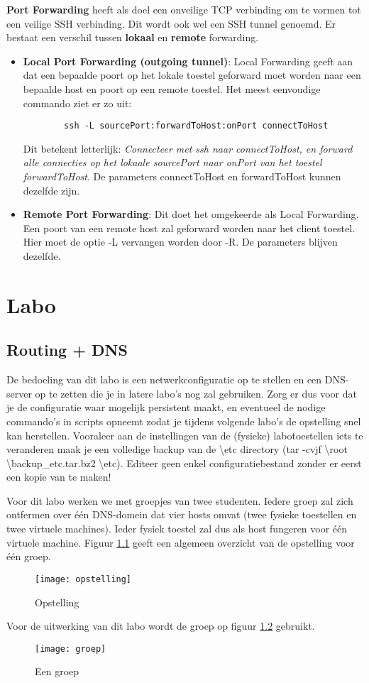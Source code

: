 \documentclass{report}
\begin{document}
	\textbf{Port Forwarding} heeft als doel een onveilige TCP verbinding om te vormen tot een veilige SSH verbinding. Dit wordt ook wel een SSH tunnel genoemd. Er bestaat een verschil tussen \textbf{lokaal} en \textbf{remote} forwarding. 
	\begin{itemize}
		\item \textbf{Local Port Forwarding (outgoing tunnel)}: Local Forwarding geeft aan dat een bepaalde poort op het lokale toestel geforward moet worden naar een bepaalde host en poort op een remote toestel. Het meest eenvoudige commando ziet er zo uit:
		\begin{lstlisting}
		ssh -L sourcePort:forwardToHost:onPort connectToHost
		\end{lstlisting}
		Dit betekent letterlijk: \textit{Connecteer met ssh naar connectToHost, en forward alle connecties op het lokaale sourcePort naar onPort van het toestel forwardToHost}. De parameters connectToHost en forwardToHost kunnen dezelfde zijn.	
		
		\item \textbf{Remote Port Forwarding}: Dit doet het omgekeerde als Local Forwarding. Een poort van een remote host zal geforward worden naar het client toestel. Hier moet de optie -L vervangen worden door -R. De parameters blijven dezelfde.
	\end{itemize}

	\part{Labo}
	\chapter{Routing + DNS}
	De bedoeling van dit labo is een netwerkconfiguratie op te stellen en een DNS-server op te zetten die je in latere labo's nog zal gebruiken. Zorg er dus voor dat je de configuratie waar mogelijk persistent maakt, en eventueel de nodige commando's in scripts opneemt zodat je tijdens volgende labo's de opstelling snel kan herstellen.  Vooraleer aan de instellingen van de (fysieke) labotoestellen iets te veranderen maak je een volledige backup van de \textbackslash etc directory (tar -cvjf \textbackslash root \textbackslash backup\_etc.tar.bz2 \textbackslash etc).
	Editeer geen enkel configuratiebestand zonder er eerst een kopie van te maken!
	
	Voor dit labo werken we met groepjes van twee studenten. Iedere groep zal zich ontfermen over één DNS-domein dat vier hosts omvat (twee fysieke toestellen en twee virtuele machines). Ieder fysiek toestel zal dus als host fungeren voor één virtuele machine. Figuur \ref{fig:opstelling} geeft een algemeen overzicht van de opstelling voor één groep.
	\begin{figure}
		\texttt{[image: opstelling]}
		\caption{Opstelling}
		\label{fig:opstelling}
	\end{figure}
	Voor de uitwerking van dit labo wordt de groep op figuur \ref{fig:groep} gebruikt.
	\begin{figure}
		\texttt{[image: groep]}
		\caption{Een groep}
		\label{fig:groep}
	\end{figure}
\end{document}
